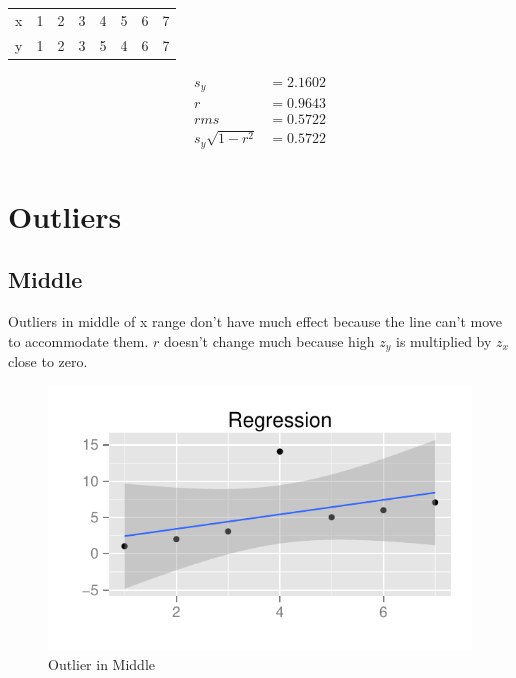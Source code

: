 \documentclass[letterpaper, landscape]{exam}
\begin{document}
  \begin{table}[H]
    \centering
    \begin{tabular}{rrrrrrrr}
      \toprule
      x & 1 & 2 & 3 & 4 & 5 & 6 & 7 \\ 
      y & 1 & 2 & 3 & 5 & 4 & 6 & 7 \\ 
     \bottomrule
    \end{tabular}
  \end{table}

  \begin{align*}
    s_y                & = 2.1602 \\
    r                  & = 0.9643 \\
    rms                & = 0.5722 \\
    s_y \sqrt{1 - r^2} & = 0.5722 \\
  \end{align*}


  \section{Outliers}

  \subsection{Middle}

  Outliers in middle of x range don't have much effect because the line can't
  move to accommodate them.  $r$ doesn't change much because high $z_y$ is
  multiplied by $z_x$ close to zero.

  \begin{figure}[H]
    \centering
    \includegraphics{figures/middle_outlier.pdf}
    \caption{Outlier in Middle}
  \end{figure}
\end{document}
